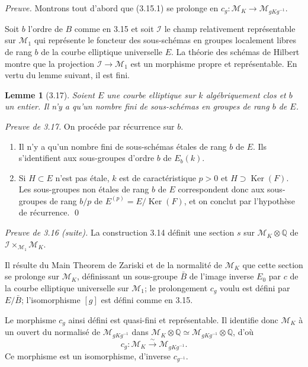\documentclass[11pt,a4paper]{amsart}
\theoremstyle{plain}
\newtheorem{lemma}[theorem]{Lemme}
\theoremstyle{definition}
\DeclareMathOperator{\Ker}{Ker}
\newcommand{\CI}{\mathcal{I}}
\newcommand{\mll}{\mathcal{M}}
\newcommand{\QQ}{\mathbb{Q}}
\begin{document}
\noindent\textit{Preuve.} Montrons tout d'abord que (3.15.1) se prolonge en $c_g \colon \mll_K \to \mll_{gKg^{-1}}$.

Soit $b$ l'ordre de $B$ comme en 3.15 et soit $\CI$ le champ relativement repr\'esentable sur $\mll_1$ qui repr\'esente le foncteur des sous-sch\'emas en groupes localement libres de rang $b$ de la courbe elliptique universelle $E$. La th\'eorie des sch\'emas de Hilbert montre que la projection $\CI \to \mll_1$ est un morphisme propre et repr\'esentable. En vertu du lemme suivant, il est fini.

\begin{lemma}[3.17]
Soient $E$ une courbe elliptique sur $k$ alg\'ebriquement clos et $b$ un entier. Il n'y a qu'un nombre fini de sous-sch\'emas en groupes de rang $b$ de $E$.
\end{lemma}

\noindent\textit{Preuve de 3.17.} On proc\'ede par r\'ecurrence sur $b$.
\begin{enumerate}[label=\alph*)]
\item Il n'y a qu'un nombre fini de sous-sch\'emas \'etales de rang $b$ de $E$. Ils s'identifient aux sous-groupes d'ordre $b$ de $E_b(k)$.
\item Si $H \subset E$ n'est pas \'etale, $k$ est de caract\'eristique $p > 0$ et $H \supset \Ker(F)$. Les sous-groupes non \'etales de rang $b$ de $E$ correspondent donc aux sous-groupes de rang $b/p$ de $E^{(p)} = E/\Ker(F)$, et on conclut par l'hypoth\`ese de r\'ecurrence.
\qed
\end{enumerate}

\noindent\textit{Preuve de 3.16 (suite).} La construction 3.14 d\'efinit une section $s$ sur $\mll_K \otimes \QQ$ de $\CI \times_{\mll_1} \mll_K$.

Il r\'esulte du Main Theorem de Zariski et de la normalit\'e de $\mll_K$ que cette section se prolonge sur $\mll_K$, d\'efinissant un sous-groupe $\bar{B}$ de l'image inverse $E_0$ par $c$ de la courbe elliptique universelle sur $\mll_1$; le prolongement $c_g$ voulu est d\'efini par $E/\bar{B}$; l'isomorphisme $[g]$ est d\'efini comme en 3.15.

Le morphisme $c_g$ ainsi d\'efini est quasi-fini et repr\'esentable. Il identifie donc $\mll_K$ \`a un ouvert du normalis\'e de $\mll_{gKg^{-1}}$ dans $\mll_K \otimes \QQ \simeq \mll_{gKg^{-1}} \otimes \QQ$, d'o\`u
\[
c_g \colon \mll_K \xrightarrow{\sim} \mll_{gKg^{-1}}.
\]
Ce morphisme est un isomorphisme, d'inverse $c_{g^{-1}}$.
\end{document}
